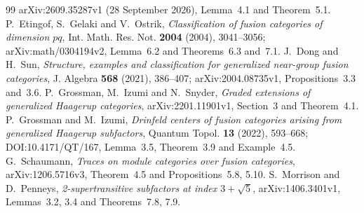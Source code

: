 \documentclass[11pt,reqno]{amsart}
\theoremstyle{definition}
\theoremstyle{remark}
\begin{document}
\begin{thebibliography}{99}
arXiv:2609.35287v1 (28 September 2026), Lemma~4.1 and Theorem~5.1.
P.~Etingof, S.~Gelaki and V.~Ostrik,
\emph{Classification of fusion categories of dimension $pq$},
Int. Math. Res. Not. \textbf{2004} (2004), 3041--3056;
arXiv:math/0304194v2, Lemma~6.2 and Theorems~6.3 and~7.1.
J.~Dong and H.~Sun, \emph{Structure, examples and classification for generalized near-group fusion categories},
J. Algebra \textbf{568} (2021), 386--407; arXiv:2004.08735v1, Propositions~3.3 and~3.6.
 P.~Grossman, M.~Izumi and N.~Snyder,
\emph{Graded extensions of generalized Haagerup categories},
arXiv:2201.11901v1, Section~3 and Theorem~4.1.
 P.~Grossman and M.~Izumi,
\emph{Drinfeld centers of fusion categories arising from generalized
Haagerup subfactors}, Quantum Topol. \textbf{13} (2022), 593--668;
DOI:10.4171/QT/167, Lemma~3.5, Theorem~3.9 and Example~4.5.
 G.~Schaumann,
\emph{Traces on module categories over fusion categories},
arXiv:1206.5716v3, Theorem~4.5 and Propositions~5.8, 5.10.
 S.~Morrison and D.~Penneys,
\emph{2-supertransitive subfactors at index $3+\sqrt5$},
arXiv:1406.3401v1, Lemmas~3.2, 3.4 and Theorems~7.8, 7.9.


\end{thebibliography}
\end{document}

